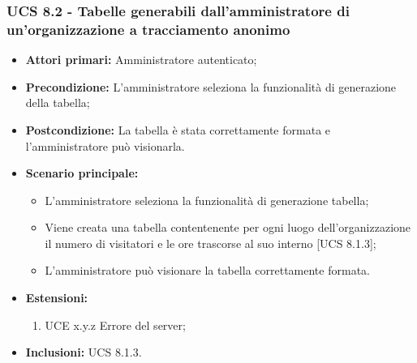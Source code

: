 \subsubsection{UCS 8.2 - Tabelle generabili dall'amministratore di un'organizzazione a tracciamento anonimo}%
\begin{itemize}
\item \textbf{Attori primari:} Amministratore autenticato;
\item \textbf{Precondizione:} L'amministratore seleziona la funzionalità di generazione della tabella;
\item \textbf{Postcondizione:} La tabella è stata correttamente formata e l'amministratore può visionarla.
\item \textbf{Scenario principale:}
	\begin{itemize}%
	\item L'amministratore seleziona la funzionalità di generazione tabella;
	\item Viene creata una tabella contentenente per ogni luogo dell'organizzazione il numero di visitatori e le ore trascorse al suo interno [UCS 8.1.3];
	\item L'amministratore può visionare la tabella correttamente formata.
\end{itemize}
\item \textbf{Estensioni:}
	\begin{enumerate}
		\item UCE x.y.z Errore del server;
	\end{enumerate}
\item \textbf{Inclusioni:} UCS 8.1.3.
\end{itemize}
